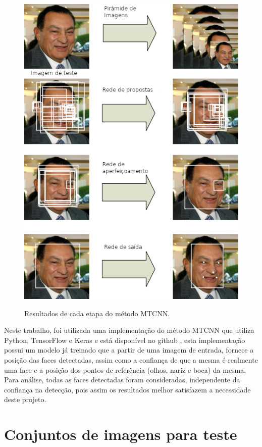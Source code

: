 \begin{figure}[htbp]
    \centering
    \caption{Resultados de cada etapa do método MTCNN.}
    \includegraphics[scale=.8]{figs/mtcnn.png}
    \label{fig:mtcnn}
\end{figure}

Neste trabalho, foi utilizada uma implementação do método MTCNN que utiliza Python, TensorFlow e Keras e está disponível no github \cite{mtcnn_github}, esta implementação possui um modelo já treinado que a partir de uma imagem de entrada, fornece a posição das faces detectadas, assim como a confiança de que a mesma é realmente uma face e a posição dos pontos de referência (olhos, nariz e boca) da mesma. Para análise, todas as faces detectadas foram consideradas, independente da confiança na detecção, pois assim os resultados melhor satisfazem a necessidade deste projeto.

\section{Conjuntos de imagens para teste}

